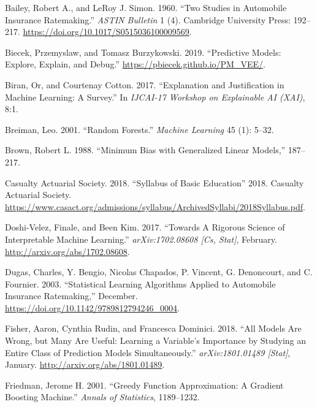 \documentclass[preprint, 3p, twocolumn, letterpaper, 10pt]{elsarticle} %
\begin{document}
\leavevmode\hypertarget{ref-bailey_simon_1960}{}%
Bailey, Robert A., and LeRoy J. Simon. 1960. ``Two Studies in Automobile Insurance Ratemaking.'' \emph{ASTIN Bulletin} 1 (4). Cambridge University Press: 192--217. \url{https://doi.org/10.1017/S0515036100009569}.

\leavevmode\hypertarget{ref-biecekPMVEE}{}%
Biecek, Przemyslaw, and Tomasz Burzykowski. 2019. ``Predictive Models: Explore, Explain, and Debug.'' \url{https://pbiecek.github.io/PM_VEE/}.

\leavevmode\hypertarget{ref-biranExplanationJustification2017}{}%
Biran, Or, and Courtenay Cotton. 2017. ``Explanation and Justification in Machine Learning: A Survey.'' In \emph{IJCAI-17 Workshop on Explainable AI (XAI)}, 8:1.

\leavevmode\hypertarget{ref-breimanRandomForests2001}{}%
Breiman, Leo. 2001. ``Random Forests.'' \emph{Machine Learning} 45 (1): 5--32.

\leavevmode\hypertarget{ref-brown_1988}{}%
Brown, Robert L. 1988. ``Minimum Bias with Generalized Linear Models,'' 187--217.

\leavevmode\hypertarget{ref-cas_syllabus_2018}{}%
Casualty Actuarial Society. 2018. ``Syllabus of Basic Education'' 2018. Casualty Actuarial Society. \url{https://www.casact.org/admissions/syllabus/ArchivedSyllabi/2018Syllabus.pdf}.

\leavevmode\hypertarget{ref-doshi-velezRigorousScience2017}{}%
Doshi-Velez, Finale, and Been Kim. 2017. ``Towards A Rigorous Science of Interpretable Machine Learning.'' \emph{arXiv:1702.08608 {[}Cs, Stat{]}}, February. \url{http://arxiv.org/abs/1702.08608}.

\leavevmode\hypertarget{ref-dugas_2003}{}%
Dugas, Charles, Y. Bengio, Nicolas Chapados, P. Vincent, G. Denoncourt, and C. Fournier. 2003. ``Statistical Learning Algorithms Applied to Automobile Insurance Ratemaking,'' December. \url{https://doi.org/10.1142/9789812794246_0004}.

\leavevmode\hypertarget{ref-fisherAllModels2018}{}%
Fisher, Aaron, Cynthia Rudin, and Francesca Dominici. 2018. ``All Models Are Wrong, but Many Are Useful: Learning a Variable's Importance by Studying an Entire Class of Prediction Models Simultaneously.'' \emph{arXiv:1801.01489 {[}Stat{]}}, January. \url{http://arxiv.org/abs/1801.01489}.

\leavevmode\hypertarget{ref-friedmanGreedyFunction2001}{}%
Friedman, Jerome H. 2001. ``Greedy Function Approximation: A Gradient Boosting Machine.'' \emph{Annals of Statistics}, 1189--1232.
\end{document}
